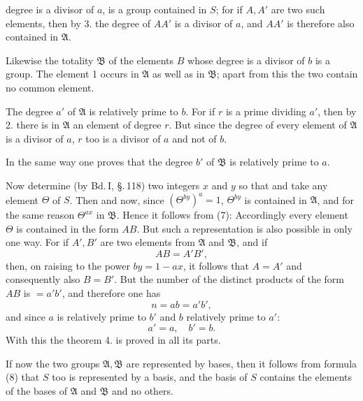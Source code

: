 degree is a divisor of $a$, is a group contained in $S$; for if $A, A'$ are two such elements, then by 3. the degree of $AA'$ is a divisor of $a$, and $AA'$ is therefore also contained in $\mathfrak{A}$.

Likewise the totality $\mathfrak{B}$ of the elements $B$ whose degree is a divisor of $b$ is a group. The element 1 occurs in $\mathfrak{A}$ as well as in $\mathfrak{B}$; apart from this the two contain no common element.

The degree $a'$ of $\mathfrak{A}$ is relatively prime to $b$. For if $r$ is a prime dividing $a'$, then by 2. there is in $\mathfrak{A}$ an element of degree $r$. But since the degree of every element of $\mathfrak{A}$ is a divisor of $a$, $r$ too is a divisor of $a$ and not of $b$.

In the same way one proves that the degree $b'$ of $\mathfrak{B}$ is relatively prime to $a$.

Now determine (by Bd.\,I, \S.\,118) two integers $x$ and $y$ so that
and take any element $\Theta$ of $S$. Then
and now, since $(\Theta^{by})^a = 1$, $\Theta^{by}$ is contained in $\mathfrak{A}$, and for the same reason $\Theta^{ax}$ in $\mathfrak{B}$. Hence it follows from (7):
Accordingly every element $\Theta$ is contained in the form $AB$. But such a representation is also possible in only one way. For if $A', B'$ are two elements from $\mathfrak{A}$ and $\mathfrak{B}$, and if
\[
AB = A'B',
\]
then, on raising to the power $by = 1 - ax$, it follows that $A = A'$ and consequently also $B = B'$. But the number of the distinct products of the form $AB$ is $= a'b'$, and therefore one has
\[
n = ab = a'b',
\]
and since $a$ is relatively prime to $b'$ and $b$ relatively prime to $a'$:
\[
a' = a,\quad b' = b.
\]
With this the theorem 4. is proved in all its parts.

If now the two groups $\mathfrak{A}, \mathfrak{B}$ are represented by bases, then it follows from formula (8) that $S$ too is represented by a basis, and the basis of $S$ contains the elements of the bases of $\mathfrak{A}$ and $\mathfrak{B}$ and no others.
